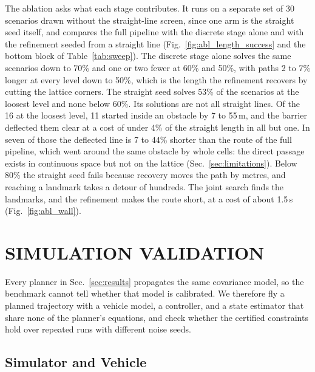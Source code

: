 \documentclass[letterpaper, 10 pt, conference]{ieeeconf}
\theoremstyle{remark}
\begin{document}
The ablation asks what each stage contributes. It runs on a separate set of
30 scenarios drawn without the straight-line screen, since one arm is the
straight seed itself, and compares the full pipeline with the discrete stage
alone and with the refinement seeded from a straight line
(Fig.~\ref{fig:abl_length_success} and the bottom block of
Table~\ref{tab:sweep}). The discrete stage alone solves the same scenarios
down to 70\% and one or two fewer at 60\% and 50\%, with paths 2 to 7\%
longer at every level down to 50\%, which is the length the refinement
recovers by cutting the lattice corners. The straight seed solves 53\% of
the scenarios at the loosest level and none below 60\%. Its solutions are
not all straight lines. Of the 16 at the loosest level, 11 started inside an
obstacle by 7 to 55\,m, and the barrier deflected them clear at a cost of
under 4\% of the straight length in all but one. In seven of those the
deflected line is 7 to 44\% shorter than the route of the full pipeline,
which went around the same obstacle by whole cells: the direct passage exists
in continuous space but not on the lattice
(Sec.~\ref{sec:limitations}). Below 80\% the straight seed fails because
recovery moves the path by metres, and reaching a landmark takes a detour of
hundreds. The joint search finds the landmarks, and the
refinement makes the route short, at a cost of about 1.5\,s
(Fig.~\ref{fig:abl_wall}).

\section{SIMULATION VALIDATION}
\label{sec:sim}
Every planner in Sec.~\ref{sec:results} propagates the same covariance
model, so the benchmark cannot tell whether that model is calibrated. We
therefore fly a planned trajectory with a vehicle model, a controller, and a
state estimator that share none of the planner's equations, and check
whether the certified constraints hold over repeated runs with different
noise seeds.

\subsection{Simulator and Vehicle}
\end{document}
